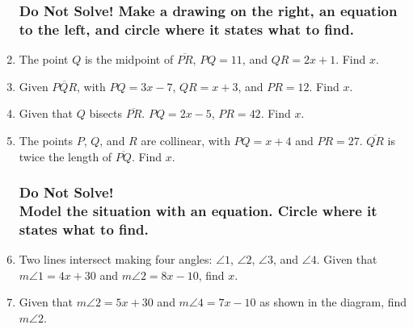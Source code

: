 \documentclass[12pt, twoside]{article}
\begin{document}
\begin{enumerate}
\newpage   
  \subsubsection*{Do Not Solve! Make a drawing on the right, an equation to the left, and circle where it states what to find.}
  \vspace{0.5cm}

\item The point $Q$ is the midpoint of $\overline{PR}$, $PQ=11$, and $QR=2x+1$. Find ${x}$.
\vspace{4cm}

\item Given $\overline{PQR}$, with $PQ=3x-7$, $QR=x+3$, and $PR=12$. Find ${x}$.
\vspace{4cm}

\item Given that $Q$ bisects $\overline{PR}$. $PQ=2x-5$, $PR=42$. Find ${x}$.
\vspace{4cm}

\item The points $P$, $Q$, and $R$ are collinear, with $PQ=x+4$ and $PR=27$. $\overline{QR}$ is twice the length of $\overline{PQ}$. Find ${x}$.

\newpage
\subsubsection*{Do Not Solve! \\
Model the situation with an equation. Circle where it states what to find.}
\vspace{0.5cm}

\item Two lines intersect making four angles: $\angle 1$, $\angle 2$, $\angle 3$, and $\angle 4$. Given that $m\angle 1= 4x+30$ and $m\angle 2=8x-10$, find $x$.
\begin{flushright}
\end{flushright}

\item Given that $m\angle 2= 5x+30$ and $m\angle 4=7x-10$ as shown in the diagram, find $m\angle 2$.
\begin{flushright}
\end{flushright}


\end{enumerate}
\end{document}
